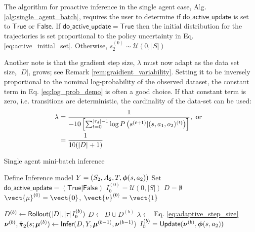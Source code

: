 The algorithm for proactive inference in the single agent case, Alg. \ref{alg:single_agent_batch}, requires the user to determine if $\mathsf{do\_active\_update}$ is set to $\mathsf{True}$ or $\mathsf{False}$. If $\mathsf{do\_active\_update}=\mathsf{True}$ then the initial distribution for the trajectories is set proportional to the policy uncertainty in Eq. \ref{eq:active_initial_set}. Otherwise, $s_2^{(0)} \sim \mathcal{U}(0,|S|)$

Another note is that the gradient step size, $\lambda$ must now adapt as the data set size, $|D|$, grows; see Remark \ref{rem:graidient_variability}. Setting it to be inversely proportional to the nominal log-probability of the observed dataset, the constant term in Eq. \ref{eq:log_prob_demo} is often a good choice. If that constant term is zero, i.e. transitions are deterministic, the cardinality of the data-set can be used:
\begin{equation}\label{eq:adaptive_step_size}
\begin{aligned}
	\lambda & = \frac{1}{-10 \left[ \sum_{t=0}^{\lvert\tau_d\rvert-1} \log P \left(s^{(t+1)}|(s, a_1, o_2)^{(t)}\right)\right]},\ \text{or}\\
		& = \frac{1}{10(|D|+1)}
		\end{aligned}
\end{equation}

	\begin{algorithm}
	\caption{Single agent mini-batch inference}
	\label{alg:single_agent_batch}
	\begin{algorithmic}[1]
		\State Define Inference model $Y=(S_2,A_2,T,\boldsymbol{\mathbb{\phi}}(s, a_2))$
		\State Set $\mathsf{do\_active\_update}=(\mathsf{True}|\mathsf{False})$
		\State $I_0^{(0)} = \mathcal{U}(0,|S|)$
		\State $D=\emptyset$ 
		\State $\vect{\mu}^{(0)} = \vect{0}$, $\vect{\nu}^{(0)} = \vect{1}$ 
		
		\State $D^{(b)} \leftarrow \mathsf{Rollout}(|D|,|\tau|I_0^{(b)})$
		\State $D \leftarrow D \cup D^{(b)}$
		\State $\lambda \leftarrow $ Eq. \ref{eq:adaptive_step_size}
		\State
		$\boldsymbol{\mathbb{\nu}}^{(b)} , \hat{\pi_{}}_2(s;\boldsymbol{\mathbb{\mu}}^{(b)})
		\leftarrow \mathsf{Infer}(D,Y,\boldsymbol{\mathbb{\mu}}^{(b-1)}, \boldsymbol{\mathbb{\nu}}^{(b-1)} )$
		\State $I_0^{(b)} = \mathsf{Update}(\boldsymbol{\mathbb{\nu}}^{(b)}, \boldsymbol{\mathbb{\phi}}(s, a_2))$
		\EndIf
		\EndFor
	\end{algorithmic}
\end{algorithm}

